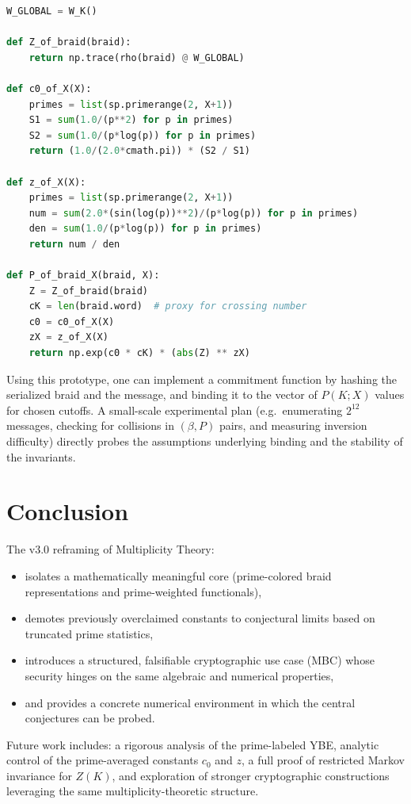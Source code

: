 \documentclass[11pt]{article}
\begin{document}
\begin{lstlisting}[language=Python,caption={Core v3.0 prototype code (4-strand case)}]
W_GLOBAL = W_K()

def Z_of_braid(braid):
    return np.trace(rho(braid) @ W_GLOBAL)

def c0_of_X(X):
    primes = list(sp.primerange(2, X+1))
    S1 = sum(1.0/(p**2) for p in primes)
    S2 = sum(1.0/(p*log(p)) for p in primes)
    return (1.0/(2.0*cmath.pi)) * (S2 / S1)

def z_of_X(X):
    primes = list(sp.primerange(2, X+1))
    num = sum(2.0*(sin(log(p))**2)/(p*log(p)) for p in primes)
    den = sum(1.0/(p*log(p)) for p in primes)
    return num / den

def P_of_braid_X(braid, X):
    Z = Z_of_braid(braid)
    cK = len(braid.word)  # proxy for crossing number
    c0 = c0_of_X(X)
    zX = z_of_X(X)
    return np.exp(c0 * cK) * (abs(Z) ** zX)
\end{lstlisting}

Using this prototype, one can implement a commitment function by hashing the serialized braid and the message, and binding it to the vector of $P(K;X)$ values for chosen cutoffs. A small-scale experimental plan (e.g.\ enumerating $2^{12}$ messages, checking for collisions in $(\beta,P)$ pairs, and measuring inversion difficulty) directly probes the assumptions underlying binding and the stability of the invariants.

\section{Conclusion}

The v3.0 reframing of Multiplicity Theory:

\begin{itemize}
  \item isolates a mathematically meaningful core (prime-colored braid representations and prime-weighted functionals),
  \item demotes previously overclaimed constants to conjectural limits based on truncated prime statistics,
  \item introduces a structured, falsifiable cryptographic use case (MBC) whose security hinges on the same algebraic and numerical properties,
  \item and provides a concrete numerical environment in which the central conjectures can be probed.
\end{itemize}

Future work includes: a rigorous analysis of the prime-labeled YBE, analytic control of the prime-averaged constants $c_0$ and $z$, a full proof of restricted Markov invariance for $Z(K)$, and exploration of stronger cryptographic constructions leveraging the same multiplicity-theoretic structure.

\nocite{*}


\end{document}
